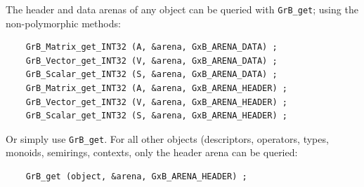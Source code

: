 The header and data arenas of any object can be queried with \verb'GrB_get';
using the non-polymorphic methods:

{\footnotesize
\begin{verbatim}
    GrB_Matrix_get_INT32 (A, &arena, GxB_ARENA_DATA) ;
    GrB_Vector_get_INT32 (V, &arena, GxB_ARENA_DATA) ;
    GrB_Scalar_get_INT32 (S, &arena, GxB_ARENA_DATA) ;
    GrB_Matrix_get_INT32 (A, &arena, GxB_ARENA_HEADER) ;
    GrB_Vector_get_INT32 (V, &arena, GxB_ARENA_HEADER) ;
    GrB_Scalar_get_INT32 (S, &arena, GxB_ARENA_HEADER) ;
\end{verbatim}}

Or simply use \verb'GrB_get'.  For all other objects (descriptors, operators,
types, monoids, semirings, contexts, only the header arena can be queried:

{\footnotesize
\begin{verbatim}
    GrB_get (object, &arena, GxB_ARENA_HEADER) ;
\end{verbatim}}

